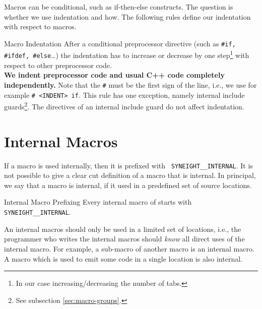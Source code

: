 Macros can be conditional, such as if-then-else constructs. The
question is whether we use indentation and how. The following rules
define our indentation with respect to macros.
%
\begin{rule*}{Macro Indentation}
  After a conditional preprocessor directive (such as {\tt \#if,
    \#ifdef, \#else}\dots) the indentation has to increase or decrease
  by one step\footnote{In our case increasing/decreasing the number of
    tabs.} with respect to other preprocessor code.\\
  \textbf{We indent preprocessor code and usual C++ code completely
  independently.}
  Note that the {\tt \#} must be the first sign of the line, i.e., we
  use for example {\tt \# <INDENT> if}.
  This rule has one exception, namely internal include
  guards\footnote{See subsection \vref{sec:macro-groups}.}. The
  directives of an internal include guard do not affect indentation.
\end{rule*}


\section{Internal Macros}
\label{sec:internal-macros}

%
If a macro is used internally, then it is prefixed with {\tt
  SYNEIGHT\_\_INTERNAL}. It is not possible to give a clear cut
definition of a macro that is internal. In principal, we say that a
macro is internal, if it used in a predefined set of source
  locations.
%
\begin{rule*}{Internal Macro Prefixing}
  Every internal macro of \SYNEIGHT starts with {\tt
    SYNEIGHT\_\_INTERNAL}.
\end{rule*}
%
An internal macros should only be used in a limited set of locations,
i.e., the programmer who writes the internal macros should \emph{know}
all direct uses of the internal macro. For example, a sub-macro of
another macro is an internal macro. A macro which is used to emit some
code in a single location is also internal. 

